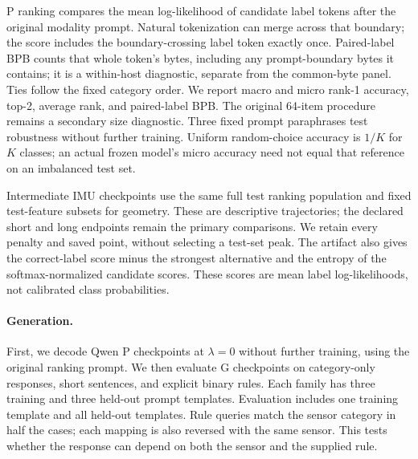 \documentclass[11pt]{article}
\begin{document}
P ranking compares the mean log-likelihood of candidate label tokens after the
original modality prompt. Natural tokenization can merge across that boundary;
the score includes the boundary-crossing label token exactly once. Paired-label
BPB counts that whole token's bytes, including any prompt-boundary bytes it
contains; it is a within-host diagnostic, separate from the common-byte panel.
Ties follow
the fixed category order. We report macro and micro rank-1 accuracy, top-2,
average rank, and paired-label BPB. The original 64-item procedure remains a
secondary size diagnostic. Three fixed prompt paraphrases test robustness
without further training. Uniform random-choice accuracy is $1/K$ for $K$
classes; an actual frozen model's micro accuracy need not equal that reference
on an imbalanced test set.

Intermediate IMU checkpoints use the same full test ranking population and
fixed test-feature subsets for geometry. These are descriptive trajectories;
the declared short and long endpoints remain the primary comparisons. We
retain every penalty and saved point, without selecting a test-set peak.
The artifact also gives the correct-label score minus the strongest alternative
and the entropy of the softmax-normalized candidate scores. These scores are
mean label log-likelihoods, not calibrated class probabilities.

\paragraph{Generation.}
First, we decode Qwen P checkpoints at $\lambda=0$ without further training,
using the original ranking prompt. We then evaluate G checkpoints on category-only responses,
short sentences, and explicit binary rules. Each family has three training and
three held-out prompt templates. Evaluation includes one training template and
all held-out templates. Rule queries match the sensor category in half the
cases; each mapping is also reversed with the same sensor. This tests whether
the response can depend on both the sensor and the supplied rule.
\end{document}
